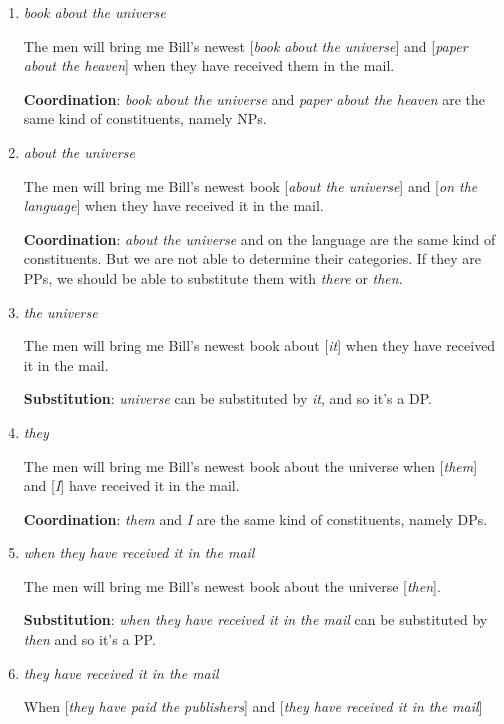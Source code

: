 \documentclass[a4paper,12pt]{article}
\begin{document}
\begin{enumerate}
\begin{enumerate}
      \item \textit{book about the universe}

         The men will bring me Bill's newest [\textit{book about the universe}] and [\textit{paper about the heaven}] when they have received them in the mail.

         \textbf {Coordination}: \textit{book about the universe} and \textit{paper about the heaven} are the same kind of constituents, namely NPs.

      \item \textit{about the universe}

         The men will bring me Bill's newest book [\textit{about the universe}] and [\textit {on the language}] when they have received it in the mail.

         \textbf {Coordination}: \textit{about the universe} and {on the language} are the same kind of constituents. But we are not able to determine their categories. If they are PPs, we should be able to substitute them with \textit {there} or \textit {then}.

      \item \textit{the universe}

         The men will bring me Bill's newest book about [\textit{it}] when they have received it in the mail.

         \textbf {Substitution}: \textit{universe} can be substituted by \textit{it}, and so it's a DP.

      \item \textit{they}

         The men will bring me Bill's newest book about the universe when [\textit{them}] and [\textit{I}] have received it in the mail.

         \textbf {Coordination}: \textit{them} and \textit{I} are the same kind of constituents, namely DPs.

      \item \textit{when they have received it in the mail}

         The men will bring me Bill's newest book about the universe [\textit {then}].

         \textbf {Substitution}: \textit{when they have received it in the mail} can be substituted by \textit {then} and so it's a PP.

      \item \textit{they have received it in the mail}

         When [\textit{they have paid the publishers}] and [\textit{they have received it in the mail}]


\end{enumerate}
\end{enumerate}
\end{document}
